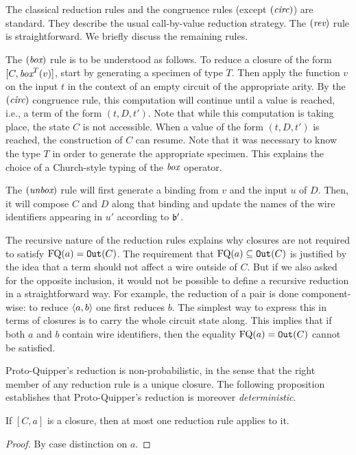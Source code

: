 \documentclass[twoside]{article}
\begin{document}
The classical reduction rules and the congruence rules (except $(\textit{circ})$) 
are standard. They describe the usual call-by-value reduction strategy. 
The $(\mathop{\textit{rev}}\nolimits)$ rule is straightforward. We briefly discuss the remaining 
rules. 

The $(\mathop{\textit{box}}\nolimits)$ rule is to be understood as follows. To reduce a closure
of the form $[C, \mathop{\textit{box}}\nolimits^T(v)]$, start by generating a specimen of type
$T$. Then apply the function $v$ on the input $t$ in the context of an
empty circuit of the appropriate arity.  By the $(\textit{circ})$
congruence rule, this computation will continue until a value is
reached, i.e., a term of the form $(t,D,t')$. Note that while this
computation is taking place, the state $C$ is not accessible. When a
value of the form $(t,D,t')$ is reached, the construction of $C$ can
resume. Note that it was necessary to know the type $T$ in order to
generate the appropriate specimen. This explains the choice of a
Church-style typing of the $\mathop{\textit{box}}\nolimits$ operator. 

The $(\mathop{\textit{unbox}}\nolimits)$ rule will first generate a binding from $v$ and the
input $u$ of $D$. Then, it will compose $C$ and $D$ along that binding
and update the names of the wire identifiers appearing in $u'$
according to $\mathfrak{b}'$.

The recursive nature of the reduction rules explains why closures are 
not required to satisfy $\mathop{\textrm{FQ}}\nolimits(a)=\mathtt{Out}(C)$. The requirement that 
$\mathop{\textrm{FQ}}\nolimits(a)\subseteq \mathtt{Out}(C)$ is justified by the idea that a term 
should not affect a wire outside of $C$. But if we also asked for the 
opposite inclusion, it would not be possible to define a recursive
reduction in a straightforward way. For example, the reduction of a 
pair is done component-wise: to reduce $\langle a,b\rangle$ one first reduces $b$. 
The simplest way to express this in terms of closures is to carry the 
whole circuit state along. This implies that if both $a$ and $b$ 
contain wire identifiers, then the equality $\mathop{\textrm{FQ}}\nolimits(a)=\mathtt{Out}(C)$ 
cannot be satisfied.

Proto-Quipper's reduction is non-probabilistic, in the sense that the 
right member of any reduction rule is a unique closure. The following 
proposition establishes that Proto-Quipper's reduction is moreover  
\emph{deterministic}.

\begin{proposition}
\label{determinicity}
If $[C,a]$ is a closure, then at most one reduction rule applies
to it.
\end{proposition}

\begin{proof}
By case distinction on $a$.
\end{proof}
\end{document}
